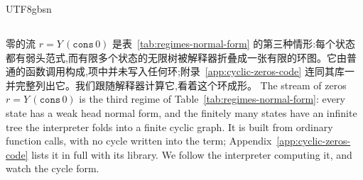 \begin{CJK*}{UTF8}{gbsn}
  \subsection{}\label{sec:application-cycles}

  \ifPaperChinese
  零的流 $r = Y\,(\mathtt{cons}\,0)$ 是表~\ref{tab:regimes-normal-form} 的第三种情形:每个状态都有弱头范式,而有限多个状态的无限树被解释器折叠成一张有限的环图。它由普通的函数调用构成,项中并未写入任何环;附录~\ref{app:cyclic-zeros-code} 连同其库一并完整列出它。我们跟随解释器计算它,看着这个环成形。
  \else
  The stream of zeros $r = Y\,(\mathtt{cons}\,0)$ is the third regime of Table~\ref{tab:regimes-normal-form}: every state has a weak head normal form, and the finitely many states have an infinite tree the interpreter folds into a finite cyclic graph. It is built from ordinary function calls, with no cycle written into the term; Appendix~\ref{app:cyclic-zeros-code} lists it in full with its library. We follow the interpreter computing it, and watch the cycle form.
  \fi


\end{CJK*}
